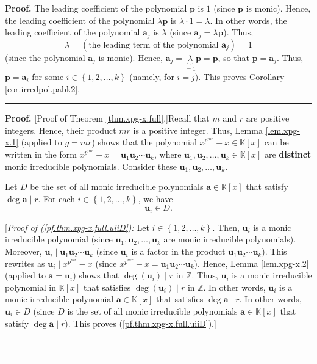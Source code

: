 \documentclass[numbers=enddot,12pt,final,onecolumn,notitlepage]{scrartcl}%
\theoremstyle{definition}
\newenvironment{proof}[1][Proof]{\noindent\textbf{#1.} }{\ \rule{0.5em}{0.5em}}
\begin{document}
\begin{proof}
The leading coefficient of the polynomial $\mathbf{p}$ is $1$ (since
$\mathbf{p}$ is monic). Hence, the leading coefficient of the polynomial
$\lambda\mathbf{p}$ is $\lambda\cdot1=\lambda$. In other words, the leading
coefficient of the polynomial $\mathbf{a}_{j}$ is $\lambda$ (since
$\mathbf{a}_{j}=\lambda\mathbf{p}$). Thus,%
\[
\lambda=\left(  \text{the leading term of the polynomial }\mathbf{a}%
_{j}\right)  =1
\]
(since the polynomial $\mathbf{a}_{j}$ is monic). Hence, $\mathbf{a}%
_{j}=\underbrace{\lambda}_{=1}\mathbf{p}=\mathbf{p}$, so that $\mathbf{p}%
=\mathbf{a}_{j}$. Thus, $\mathbf{p}=\mathbf{a}_{i}$ for some $i\in\left\{
1,2,\ldots,k\right\}  $ (namely, for $i=j$). This proves Corollary
\ref{cor.irredpol.pabk2}.
\end{proof}

\begin{proof}
[Proof of Theorem \ref{thm.xpg-x.full}.]Recall that $m$ and $r$ are positive
integers. Hence, their product $mr$ is a positive integer. Thus, Lemma
\ref{lem.xpg-x.1} (applied to $g=mr$) shows that the polynomial $x^{p^{mr}%
}-x\in\mathbb{K}\left[  x\right]  $ can be written in the form $x^{p^{mr}%
}-x=\mathbf{u}_{1}\mathbf{u}_{2}\cdots\mathbf{u}_{k}$, where $\mathbf{u}%
_{1},\mathbf{u}_{2},\ldots,\mathbf{u}_{k}\in\mathbb{K}\left[  x\right]  $ are
\textbf{distinct} monic irreducible polynomials. Consider these $\mathbf{u}%
_{1},\mathbf{u}_{2},\ldots,\mathbf{u}_{k}$.

Let $D$ be the set of all monic irreducible polynomials $\mathbf{a}%
\in\mathbb{K}\left[  x\right]  $ that satisfy $\deg\mathbf{a}\mid r$. For each
$i\in\left\{  1,2,\ldots,k\right\}  $, we have%
\begin{equation}
\mathbf{u}_{i}\in D. \label{pf.thm.xpg-x.full.uiiD}%
\end{equation}


[\textit{Proof of (\ref{pf.thm.xpg-x.full.uiiD}):} Let $i\in\left\{
1,2,\ldots,k\right\}  $. Then, $\mathbf{u}_{i}$ is a monic irreducible
polynomial (since $\mathbf{u}_{1},\mathbf{u}_{2},\ldots,\mathbf{u}_{k}$ are
monic irreducible polynomials). Moreover, $\mathbf{u}_{i}\mid\mathbf{u}%
_{1}\mathbf{u}_{2}\cdots\mathbf{u}_{k}$ (since $\mathbf{u}_{i}$ is a factor in
the product $\mathbf{u}_{1}\mathbf{u}_{2}\cdots\mathbf{u}_{k}$). This rewrites
as $\mathbf{u}_{i}\mid x^{p^{mr}}-x$ (since $x^{p^{mr}}-x=\mathbf{u}%
_{1}\mathbf{u}_{2}\cdots\mathbf{u}_{k}$). Hence, Lemma \ref{lem.xpg-x.2}
(applied to $\mathbf{a}=\mathbf{u}_{i}$) shows that $\deg\left(
\mathbf{u}_{i}\right)  \mid r$ in $\mathbb{Z}$. Thus, $\mathbf{u}_{i}$ is a
monic irreducible polynomial in $\mathbb{K}\left[  x\right]  $ that satisfies
$\deg\left(  \mathbf{u}_{i}\right)  \mid r$ in $\mathbb{Z}$. In other words,
$\mathbf{u}_{i}$ is a monic irreducible polynomial $\mathbf{a}\in
\mathbb{K}\left[  x\right]  $ that satisfies $\deg\mathbf{a}\mid r$. In other
words, $\mathbf{u}_{i}\in D$ (since $D$ is the set of all monic irreducible
polynomials $\mathbf{a}\in\mathbb{K}\left[  x\right]  $ that satisfy
$\deg\mathbf{a}\mid r$). This proves (\ref{pf.thm.xpg-x.full.uiiD}).]


\end{proof}
\end{document}
